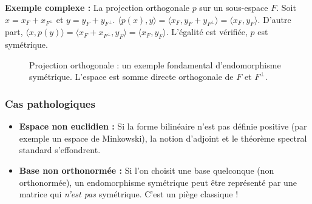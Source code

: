 \documentclass[11pt,a4paper]{article}
\begin{document}
\textbf{Exemple complexe :} La projection orthogonale $p$ sur un sous-espace $F$. Soit $x = x_F + x_{F^\perp}$ et $y = y_F + y_{F^\perp}$.
$\langle p(x), y \rangle = \langle x_F, y_F + y_{F^\perp} \rangle = \langle x_F, y_F \rangle$.
D'autre part, $\langle x, p(y) \rangle = \langle x_F + x_{F^\perp}, y_F \rangle = \langle x_F, y_F \rangle$. L'égalité est vérifiée, $p$ est symétrique.

\begin{figure}[h!]
\centering
{}
\caption{Projection orthogonale : un exemple fondamental d'endomorphisme symétrique. L'espace est somme directe orthogonale de $F$ et $F^\perp$.}
\end{figure}



\subsubsection{Cas pathologiques}

\begin{itemize}
\item \textbf{Espace non euclidien :} Si la forme bilinéaire n'est pas définie positive (par exemple un espace de Minkowski), la notion d'adjoint et le théorème spectral standard s'effondrent.
\item \textbf{Base non orthonormée :} Si l'on choisit une base quelconque (non orthonormée), un endomorphisme symétrique peut être représenté par une matrice qui \textit{n'est pas} symétrique. C'est un piège classique !
\end{itemize}
\end{document}
